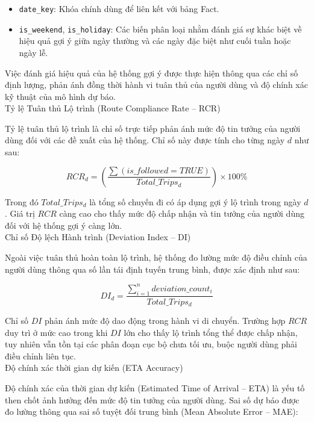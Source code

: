 \begin{itemize}
    \item \texttt{date\_key}: Khóa chính dùng để liên kết với bảng Fact.
    \item \texttt{is\_weekend}, \texttt{is\_holiday}: Các biến phân loại nhằm đánh giá sự khác biệt về hiệu quả gợi ý giữa ngày thường và các ngày đặc biệt như cuối tuần hoặc ngày lễ.
\end{itemize}


Việc đánh giá hiệu quả của hệ thống gợi ý được thực hiện thông qua các chỉ số định lượng, phản ánh đồng thời hành vi tuân thủ của người dùng và độ chính xác kỹ thuật của mô hình dự báo.\\

Tỷ lệ Tuân thủ Lộ trình (Route Compliance Rate -- RCR)

Tỷ lệ tuân thủ lộ trình là chỉ số trực tiếp phản ánh mức độ tin tưởng của người dùng đối với các đề xuất của hệ thống. Chỉ số này được tính cho từng ngày $d$ như sau:

\[
RCR_d = \left( \frac{\sum (is\_followed = TRUE)}{Total\_Trips_d} \right) \times 100\%
\]

Trong đó $Total\_Trips_d$ là tổng số chuyến đi có áp dụng gợi ý lộ trình trong ngày $d$. Giá trị $RCR$ càng cao cho thấy mức độ chấp nhận và tin tưởng của người dùng đối với hệ thống gợi ý càng lớn.\\

Chỉ số Độ lệch Hành trình (Deviation Index -- DI)

Ngoài việc tuân thủ hoàn toàn lộ trình, hệ thống đo lường mức độ điều chỉnh của người dùng thông qua số lần tái định tuyến trung bình, được xác định như sau:

\[
DI_d = \frac{\sum_{i=1}^{n} deviation\_count_i}{Total\_Trips_d}
\]

Chỉ số $DI$ phản ánh mức độ dao động trong hành vi di chuyển. Trường hợp $RCR$ duy trì ở mức cao trong khi $DI$ lớn cho thấy lộ trình tổng thể được chấp nhận, tuy nhiên vẫn tồn tại các phân đoạn cục bộ chưa tối ưu, buộc người dùng phải điều chỉnh liên tục.\\

Độ chính xác thời gian dự kiến (ETA Accuracy)

Độ chính xác của thời gian dự kiến (Estimated Time of Arrival -- ETA) là yếu tố then chốt ảnh hưởng đến mức độ tin tưởng của người dùng. Sai số dự báo được đo lường thông qua sai số tuyệt đối trung bình (Mean Absolute Error -- MAE):

